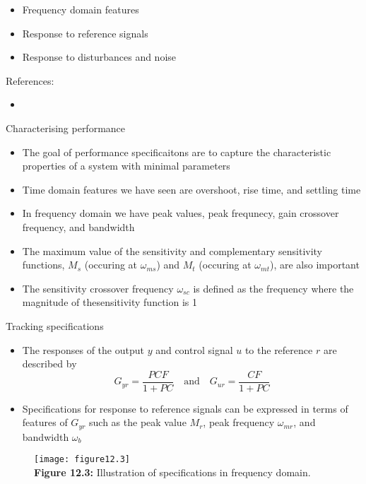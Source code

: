 \documentclass{beamer-control}
\begin{document}

\begin{SUMMARY}
\begin{itemize}
\item Frequency domain features 
\item Response to reference signals
\item Response to disturbances and noise
\end{itemize}
\vfill References:
\begin{itemize}
\item {}
\end{itemize}
\end{SUMMARY}


\begin{frame}{Characterising performance}
	\begin{itemize}
		\item The goal of performance specificaitons are to capture the characteristic properties of a system with minimal parameters
		\item Time domain features we have seen are overshoot, rise time, and settling time
		\item In frequency domain we have peak values, peak frequnecy, gain crossover frequency, and bandwidth
		\item The maximum value of the sensitivity and complementary sensitivity functions, $M_s$ (occuring at $\omega_{ms}$) and $M_t$ (occuring at $\omega_{mt}$), are also important
		\item The sensitivity crossover frequency $\omega_{sc}$ is defined as the frequency where the magnitude of thesensitivity function is 1
	\end{itemize}
\end{frame}


\begin{frame}{Tracking specifications}
\begin{itemize}
\item The responses of the output $y$ and control signal $u$ to the reference $r$ are described by 
\[G_{yr} = \frac{PCF}{1+PC} \quad \text{and} \quad G_{ur} = \frac{CF}{1+PC}\]
\item Specifications for response to reference signals can be expressed in terms of features of $G_{yr}$ such as the peak value $M_r$, peak frequency $\omega_{mr}$, and bandwidth $\omega_b$
\end{itemize}
\begin{figure}
	\centering
	\texttt{[image: figure12.3]}\\
	\textbf{Figure 12.3:} Illustration of specifications in frequency domain.
\end{figure}
\end{frame}
\end{document}

